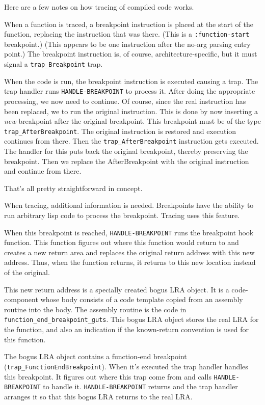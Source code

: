 Here are a few notes on how tracing of compiled code works.

When a function is traced, a breakpoint instruction is placed at the
start of the function, replacing the instruction that was there.
(This is a \verb+:function-start+ breakpoint.)  (This appears to be
one instruction after the no-arg parsing entry point.)  The breakpoint
instruction is, of course, architecture-specific, but it must signal a
\verb+trap_Breakpoint+ trap.

When the code is run, the breakpoint instruction is executed causing a
trap.  The trap handler runs \verb+HANDLE-BREAKPOINT+ to process it.
After doing the appropriate processing, we now need to continue.  Of
course, since the real instruction has been replaced, we to run the
original instruction.  This is done by now inserting a \emph{new}
breakpoint after the original breakpoint.  This breakpoint must be of
the type \verb+trap_AfterBreakpoint+.  The original instruction is
restored and execution continues from there.  Then the
\verb+trap_AfterBreakpoint+ instruction gets executed.  The handler
for this puts back the original breakpoint, thereby preserving the
breakpoint.  Then we replace the AfterBreakpoint with the original
instruction and continue from there.

That's all pretty straightforward in concept.

When tracing, additional information is needed.  Breakpoints have the
ability to run arbitrary lisp code to process the breakpoint.  Tracing
uses this feature.

When this breakpoint is reached, \verb+HANDLE-BREAKPOINT+ runs the
breakpoint hook function.  This function figures out where this
function would return to and creates a new return area and replaces
the original return address with this new address.  Thus, when the
function returns, it returns to this new location instead of the
original.

This new return address is a specially created bogus LRA object.  It
is a code-component whose body consists of a code template copied from
an assembly routine into the body.  The assembly routine is the code
in \verb+function_end_breakpoint_guts+.  This bogus LRA object stores
the real LRA for the function, and also an indication if the
known-return convention is used for this function.

The bogus LRA object contains a function-end breakpoint
(\verb+trap_FunctionEndBreakpoint+).  When it's executed the trap
handler handles this breakpoint.  It figures out where this trap come
from and calls \verb+HANDLE-BREAKPOINT+ to handle it.
\verb+HANDLE-BREAKPOINT+ returns and the trap handler arranges it so
that this bogus LRA returns to the real LRA.  

